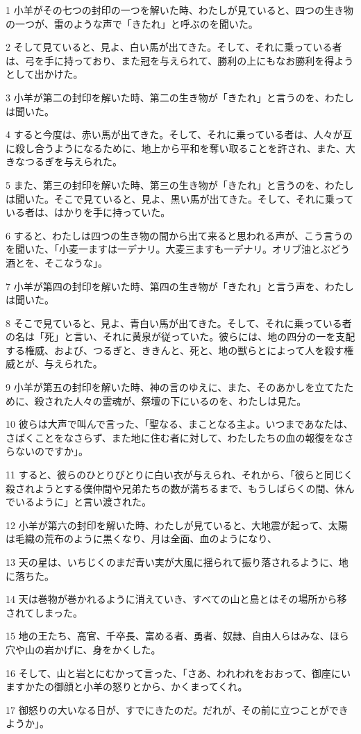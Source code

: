 \par 1 小羊がその七つの封印の一つを解いた時、わたしが見ていると、四つの生き物の一つが、雷のような声で「きたれ」と呼ぶのを聞いた。
\par 2 そして見ていると、見よ、白い馬が出てきた。そして、それに乗っている者は、弓を手に持っており、また冠を与えられて、勝利の上にもなお勝利を得ようとして出かけた。
\par 3 小羊が第二の封印を解いた時、第二の生き物が「きたれ」と言うのを、わたしは聞いた。
\par 4 すると今度は、赤い馬が出てきた。そして、それに乗っている者は、人々が互に殺し合うようになるために、地上から平和を奪い取ることを許され、また、大きなつるぎを与えられた。
\par 5 また、第三の封印を解いた時、第三の生き物が「きたれ」と言うのを、わたしは聞いた。そこで見ていると、見よ、黒い馬が出てきた。そして、それに乗っている者は、はかりを手に持っていた。
\par 6 すると、わたしは四つの生き物の間から出て来ると思われる声が、こう言うのを聞いた、「小麦一ますは一デナリ。大麦三ますも一デナリ。オリブ油とぶどう酒とを、そこなうな」。
\par 7 小羊が第四の封印を解いた時、第四の生き物が「きたれ」と言う声を、わたしは聞いた。
\par 8 そこで見ていると、見よ、青白い馬が出てきた。そして、それに乗っている者の名は「死」と言い、それに黄泉が従っていた。彼らには、地の四分の一を支配する権威、および、つるぎと、ききんと、死と、地の獣らとによって人を殺す権威とが、与えられた。
\par 9 小羊が第五の封印を解いた時、神の言のゆえに、また、そのあかしを立てたために、殺された人々の霊魂が、祭壇の下にいるのを、わたしは見た。
\par 10 彼らは大声で叫んで言った、「聖なる、まことなる主よ。いつまであなたは、さばくことをなさらず、また地に住む者に対して、わたしたちの血の報復をなさらないのですか」。
\par 11 すると、彼らのひとりびとりに白い衣が与えられ、それから、「彼らと同じく殺されようとする僕仲間や兄弟たちの数が満ちるまで、もうしばらくの間、休んでいるように」と言い渡された。
\par 12 小羊が第六の封印を解いた時、わたしが見ていると、大地震が起って、太陽は毛織の荒布のように黒くなり、月は全面、血のようになり、
\par 13 天の星は、いちじくのまだ青い実が大風に揺られて振り落されるように、地に落ちた。
\par 14 天は巻物が巻かれるように消えていき、すべての山と島とはその場所から移されてしまった。
\par 15 地の王たち、高官、千卒長、富める者、勇者、奴隷、自由人らはみな、ほら穴や山の岩かげに、身をかくした。
\par 16 そして、山と岩とにむかって言った、「さあ、われわれをおおって、御座にいますかたの御顔と小羊の怒りとから、かくまってくれ。
\par 17 御怒りの大いなる日が、すでにきたのだ。だれが、その前に立つことができようか」。

